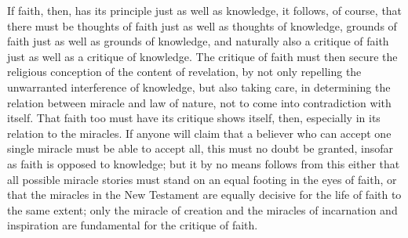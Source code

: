 \documentclass[12pt,a4paper]{article}
\newcommand{\opage}[1]{\marginnote{\footnotesize\textit{[#1]}}}
\begin{document}
If faith, then, has its principle just as well as knowledge, it
follows, of course, that there must be thoughts of faith just as well as
thoughts of knowledge, grounds of faith just as well as grounds of
knowledge, and naturally also a critique of faith just as well as a
critique of knowledge. The critique of faith must then secure the
religious conception of the content of revelation, by not only repelling
the unwarranted interference of knowledge, but also taking care, in
determining the relation between miracle and law of nature, not to come
into contradiction with itself. That faith too must have its critique
shows itself, then, especially in its relation to the miracles. If anyone
will claim that a believer who can accept one single miracle must be
able to accept all, this must no doubt be granted, insofar as faith is
opposed to knowledge; but it by no means follows from this either that
all possible miracle stories must stand on an equal footing in the eyes
of faith, or that the miracles in the
\opage{46}New Testament are equally decisive for the life of faith to the same
extent; only the miracle of creation and the miracles of incarnation and
inspiration are fundamental for the critique of faith.
\end{document}
